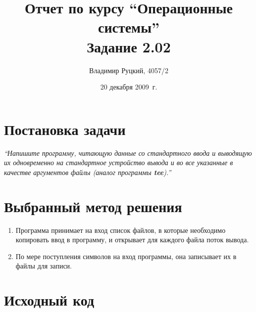 \documentclass[a4paper,12pt]{article}
\title{Отчет по курсу ``Операционные системы'' \\ Задание 2.02}
\author{Владимир Руцкий, 4057/2}
\date{20 декабря 2009~г.}
\newcommand{\commandquote}[1]{\textbf{#1}}
\begin{document}
\maketitle

\section*{Постановка задачи}
\textit{``Напишите программу, читающую данные со стандартного ввода и выводящую
их одновременно на стандартное устройство вывода и во все указанные в
качестве аргументов файлы (аналог программы \commandquote{tee}).''}

\section*{Выбранный метод решения}
\begin{enumerate}
 \item Программа принимает на вход список файлов, в которые необходимо копировать ввод в программу,
и открывает для каждого файла поток вывода.
 \item По мере поступления символов на вход программы, она записывает их в файлы для записи.
\end{enumerate}

\section*{Исходный код}
\lstset{language=bash, caption=task\_2\_02.c,%
label=source-code, basicstyle=\footnotesize,%
numbers=left, numberstyle=\footnotesize, numbersep=5pt, frame=single, breaklines=true, breakatwhitespace=false,%
inputencoding=utf8x}

\end{document}
